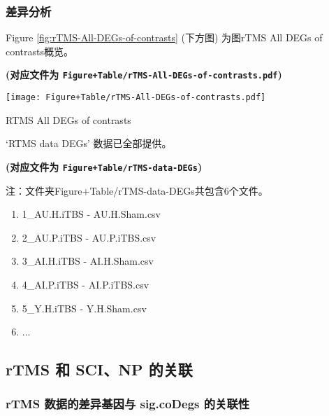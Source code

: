 \documentclass[
]{article}
\providecommand{\tightlist}{%
  \setlength{\itemsep}{0pt}\setlength{\parskip}{0pt}}
\begin{document}
\hypertarget{ux5deeux5f02ux5206ux6790-2}{%
\subsubsection{差异分析}\label{ux5deeux5f02ux5206ux6790-2}}

Figure \ref{fig:rTMS-All-DEGs-of-contrasts} (下方图) 为图rTMS All DEGs of contrasts概览。

\textbf{(对应文件为 \texttt{Figure+Table/rTMS-All-DEGs-of-contrasts.pdf})}

\def\@captype{figure}
\begin{center}
\texttt{[image: Figure+Table/rTMS-All-DEGs-of-contrasts.pdf]}
\caption{RTMS All DEGs of contrasts}\label{fig:rTMS-All-DEGs-of-contrasts}
\end{center}

`RTMS data DEGs' 数据已全部提供。

\textbf{(对应文件为 \texttt{Figure+Table/rTMS-data-DEGs})}

\begin{center}\begin{tcolorbox}[colback=gray!10, colframe=gray!50, width=0.9\linewidth, arc=1mm, boxrule=0.5pt]注：文件夹Figure+Table/rTMS-data-DEGs共包含6个文件。

\begin{enumerate}\tightlist
\item 1\_AU.H.iTBS - AU.H.Sham.csv
\item 2\_AU.P.iTBS - AU.P.iTBS.csv
\item 3\_AI.H.iTBS - AI.H.Sham.csv
\item 4\_AI.P.iTBS - AI.P.iTBS.csv
\item 5\_Y.H.iTBS - Y.H.Sham.csv
\item ...
\end{enumerate}\end{tcolorbox}
\end{center}

\hypertarget{rtms-ux548c-scinp-ux7684ux5173ux8054-1}{%
\subsection{rTMS 和 SCI、NP 的关联}\label{rtms-ux548c-scinp-ux7684ux5173ux8054-1}}

\hypertarget{rtms-ux6570ux636eux7684ux5deeux5f02ux57faux56e0ux4e0e-sig.codegs-ux7684ux5173ux8054ux6027}{%
\subsubsection{rTMS 数据的差异基因与 sig.coDegs 的关联性}\label{rtms-ux6570ux636eux7684ux5deeux5f02ux57faux56e0ux4e0e-sig.codegs-ux7684ux5173ux8054ux6027}}
\end{document}
